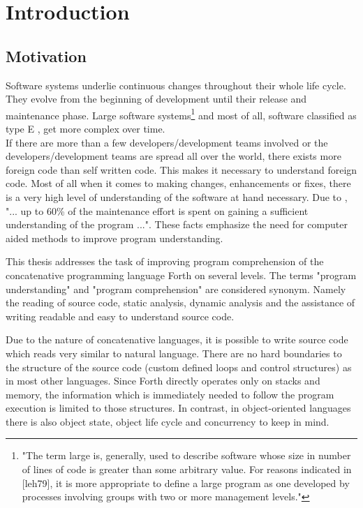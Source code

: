 \chapter{Introduction}

\section*{Motivation}

Software systems underlie continuous changes throughout their whole life cycle.
They evolve from the beginning of development until their release and maintenance phase. Large software systems\footnote{"The term large is, generally, used to describe software whose size in number of lines of code is greater than some arbitrary value. For reasons indicated in [leh79], it is more appropriate to define a large program as one developed by processes involving groups with two or more management levels."\cite{Lehman:2003:SEB:950401.950407}} and most of all, software  classified as type E \cite{Cook:2006:ESS:1115566.1115567}, get more complex over time.\\
If there are more than a few developers/development teams involved or the developers/development teams are spread all over the world, there exists more foreign code than self written code. This makes it necessary to understand foreign code.
Most of all when it comes to making changes, enhancements or fixes, there is a very high level of understanding of the software at hand necessary\cite{Boehm:1976:SE:1311958.1312684}\cite{Singer97anexamination}. Due to \cite{Cornelissen:2009:SSP:1638616.1639301}, "... up to 60\% of the maintenance effort is spent on gaining a sufficient understanding of the program ...". These facts emphasize the need for computer aided methods to improve program understanding.

This thesis addresses the task of improving program comprehension of the concatenative programming language Forth on several levels. The terms "program understanding" and "program comprehension" are considered synonym. Namely the reading of source code, static analysis, dynamic analysis and the assistance of writing readable and easy to understand source code.

Due to the nature of concatenative languages, it is possible to write source code which reads very similar to natural language. There are no hard boundaries to the structure of the source code (custom defined loops and control structures) as in most other languages. Since Forth directly operates only on stacks and memory, the information which is immediately needed to follow the program execution is limited to those structures. In contrast, in object-oriented languages there is also object state, object life cycle and concurrency to keep in mind.

